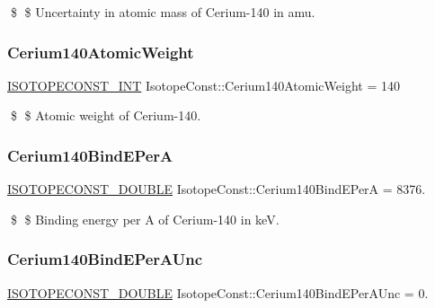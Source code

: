 \$ \$ Uncertainty in atomic mass of Cerium-\/140 in amu. \mbox{\label{group___isotope_const-_cerium-_ce140_gac7c2fe4e50e41f43a75c2b8f77830f82}} 
\subsubsection{\texorpdfstring{Cerium140\+Atomic\+Weight}{Cerium140AtomicWeight}}
{\footnotesize\ttfamily \mbox{\hyperlink{group___isotope_const-_macros_ga5f18360b3e99483a35c32d789e62621c}{I\+S\+O\+T\+O\+P\+E\+C\+O\+N\+S\+T\+\_\+\+I\+NT}} Isotope\+Const\+::\+Cerium140\+Atomic\+Weight = 140}

\$ \$ Atomic weight of Cerium-\/140. \mbox{\label{group___isotope_const-_cerium-_ce140_ga6b97e43c085322d4d0a55ad85567e5c6}} 
\subsubsection{\texorpdfstring{Cerium140\+Bind\+E\+PerA}{Cerium140BindEPerA}}
{\footnotesize\ttfamily \mbox{\hyperlink{group___isotope_const-_macros_ga8f45a7272ce02c0b4c65c44636ed719a}{I\+S\+O\+T\+O\+P\+E\+C\+O\+N\+S\+T\+\_\+\+D\+O\+U\+B\+LE}} Isotope\+Const\+::\+Cerium140\+Bind\+E\+PerA = 8376.}

\$ \$ Binding energy per A of Cerium-\/140 in keV. \mbox{\label{group___isotope_const-_cerium-_ce140_ga326dd6e59dddb66148f51da53be81ffe}} 
\subsubsection{\texorpdfstring{Cerium140\+Bind\+E\+Per\+A\+Unc}{Cerium140BindEPerAUnc}}
{\footnotesize\ttfamily \mbox{\hyperlink{group___isotope_const-_macros_ga8f45a7272ce02c0b4c65c44636ed719a}{I\+S\+O\+T\+O\+P\+E\+C\+O\+N\+S\+T\+\_\+\+D\+O\+U\+B\+LE}} Isotope\+Const\+::\+Cerium140\+Bind\+E\+Per\+A\+Unc = 0.}

